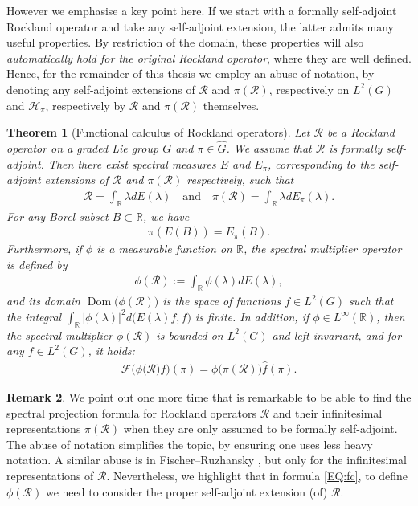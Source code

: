 \documentclass[12pt,oneside,a4paper]{book}
\numberwithin{equation}{section}     %
\theoremstyle{plain}
\newtheorem{theorem}{Theorem}[section]
\theoremstyle{definition}
\newtheorem{remark}[theorem]{Remark}
\DeclareMathOperator{\Dom}{Dom}
\newcommand{\R}{{\mathbb R}}
\begin{document}
However we emphasise a key point here. If we start with a formally self-adjoint Rockland operator and take any self-adjoint extension, the latter admits many useful properties. By restriction of the domain, these properties will also \textit{automatically hold for the original Rockland operator}, where they are well defined.
Hence, for the remainder of this thesis we employ an abuse of notation, by denoting any self-adjoint extensions of $\mathcal{R}$ and $\pi(\mathcal{R})$, respectively on $L^2(G)$ and $\mathcal H_\pi$, respectively by $\mathcal{R}$ and $\pi(\mathcal{R})$ themselves. 
\begin{theorem}[Functional calculus of Rockland operators]\label{RockFuncCalc}
	Let $\mathcal{R}$ be a Rockland operator on a graded Lie group $G$ and $\pi\in\widehat{G}$. We assume that $\mathcal{R}$ is formally self-adjoint. Then there exist spectral measures $E$ and $E_\pi$, corresponding to the self-adjoint extensions of $\mathcal R$ and $\pi(\mathcal R)$ respectively, such that
	\begin{align*}
	\mathcal{R}=\int_{\R} \lambda dE(\lambda)\quad\text{and}\quad\pi(\mathcal R)=\int_\R\lambda dE_\pi(\lambda).
	\end{align*} 
	For any Borel subset $B\subset\R$, we have 
	\begin{align*}
	\pi(E(B))=E_\pi(B).
	\end{align*}
	Furthermore, if $\phi$ is a measurable function on $\R$, the spectral multiplier operator is defined by
	\begin{align}\label{EQ:fc}
	\phi(\mathcal{R}):=\int_{\R}\phi(\lambda)dE(\lambda),
	\end{align}
	and its domain $\Dom\big(\phi(\mathcal{R})\big)$ is the space of functions $f\in L^2(G)$ such that the integral $\int_{\R}|\phi(\lambda)|^2d\big(E(\lambda)f,f\big)$ is finite. In addition, if $\phi\in L^\infty(\R)$, then the spectral multiplier $\phi(\mathcal{R})$ is bounded on $L^2(G)$ and left-invariant, and for any $f\in L^2(G)$, it holds:
	\begin{align}
	\mathcal F\Big(\phi\big(\mathcal{R}\big)f\Big)(\pi)=\phi\big(\pi(\mathcal{R})\big)\widehat f(\pi).
	\end{align}
\end{theorem}
\begin{remark}
	We point out one more time that is remarkable to be able to find the spectral projection formula for Rockland operators $\mathcal{R}$ and their infinitesimal representations $\pi(\mathcal{R})$ when they are only assumed to be formally self-adjoint. The abuse of notation simplifies the topic, by ensuring one uses less heavy notation. A similar abuse is in Fischer--Ruzhansky \cite[Corollary 4.1.16]{FR2016}, but only for the infinitesimal representations of $\mathcal{R}$. Nevertheless, we highlight that in formula \eqref{EQ:fc}, to define $\phi(\mathcal{R})$ we need to consider the proper self-adjoint extension (of) $\mathcal{R}$.
\end{remark}
\end{document}
